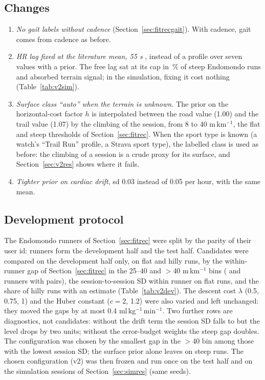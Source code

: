 \documentclass[11pt,a4paper]{article}
\newcommand{\unit}{ml\,kg$^{-1}$\,min$^{-1}$}
\begin{document}
\subsection{Changes}
\begin{enumerate}[leftmargin=*]
\item \emph{No gait labels without cadence} (Section~\ref{sec:fitrecgait}). With cadence, gait comes from cadence as before.
\item \emph{HR lag fixed at the literature mean, 55 s} \citep{hunt2015}, instead of a profile over seven values with a prior. The free lag sat at its cap in \nfrTauCapSteep\,\% of steep Endomondo runs and absorbed terrain signal; in the simulation, fixing it cost nothing (Table~\ref{tab:v2sim}).
\item \emph{Surface class ``auto'' when the terrain is unknown.} The prior on the horizontal-cost factor $h$ is interpolated between the road value (1.00) and the trail value (1.07) by the climbing of the session, from 8 to 40 m\,km$^{-1}$, the flat and steep thresholds of Section~\ref{sec:fitrec}. When the sport type is known (a watch's ``Trail Run'' profile, a Strava sport type), the labelled class is used as before: the climbing of a session is a crude proxy for its surface, and Section~\ref{sec:v2res} shows where it fails.
\item \emph{Tighter prior on cardiac drift}, sd 0.03 instead of 0.05 per hour, with the same mean.
\end{enumerate}

\subsection{Development protocol}
The Endomondo runners of Section~\ref{sec:fitrec} were split by the parity of their user id: \nnVdevRunners{} runners form the development half and \nnVtestRunners{} the test half. Candidates were compared on the development half only, on flat and hilly runs, by the within-runner gap of Section~\ref{sec:fitrec} in the 25--40 and $>$40 m\,km$^{-1}$ bins (\nnVdevHilly{} and \nnVdevSteep{} runners with pairs), the session-to-session SD within runner on flat runs, and the share of hilly runs with an estimate (Table~\ref{tab:v2dev}). The descent cost $\lambda$ (0.5, 0.75, 1) and the Huber constant ($c=2$, 1.2) were also varied and left unchanged: they moved the gaps by at most 0.4 \unit. Two further rows are diagnostics, not candidates: without the drift term the session SD falls to \nvdevSdTAnd{} but the level drops by two units; without the error-budget weights the steep gap doubles. The configuration was chosen by the smallest gap in the $>$40 bin among those with the lowest session SD; the surface prior alone leaves \nvdevDA{} on steep runs. The chosen configuration (v2) was then frozen and run once on the test half and on the simulation sessions of Section~\ref{sec:simres} (same seeds).
\end{document}
